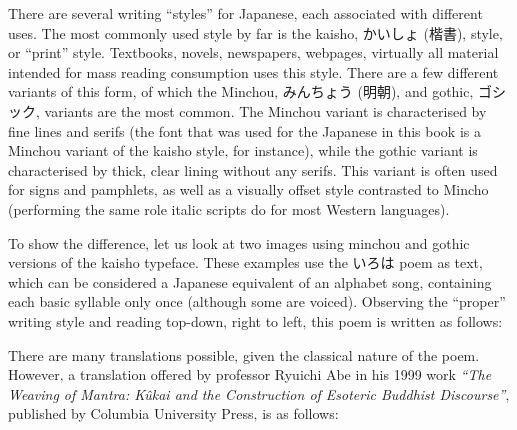 \documentclass[11pt, b5paper, twoside, openright, onecolumn]{book}
\makeatletter
\newcommand*{\rubystack}[2]{{\relscale{0.5}%
  \begin{tabular}[b]{@{}c@{}}%
    {#1}\\%
   {\textscale{2}{#2}}%
  \end{tabular}}%
}
\DeclareRobustCommand*{\ruby}[2]{%
  \mbox{%
    \setlength{\parskip}{0ex}%
    \BeginAccSupp{method=pdfstringdef,ActualText={#1}}%
      \rubystack{\phantom{#2}}{#1}%
      \llap{%
        \rubystack{#2}{\phantom{#1}}%
      }%
    \EndAccSupp{}%
  }%
}
\renewcommand*{\ruby}[2]{#2 (#1)}%
\makeatother
\begin{document}
There are several writing “styles” for Japanese‚ each associated with different uses. The most commonly used style by far is the kaisho‚ \ruby{楷書}{かいしょ}‚ style‚ or “print” style. Textbooks‚ novels‚ newspapers‚ webpages‚ virtually all material intended for mass reading consumption uses this style. There are a few different variants of this form‚ of which the Minchou‚ \ruby{明朝}{みんちょう}‚ and gothic‚ ゴシック‚ variants are the most common. The Minchou variant is characterised by fine lines and serifs (the font that was used for the Japanese in this book is a Minchou variant of the kaisho style‚ for instance)‚ while the gothic variant is characterised by thick‚ clear lining without any serifs. This variant is often used for signs and pamphlets‚ as well as a visually offset style contrasted to Mincho (performing the same role italic scripts do for most Western languages).

To show the difference‚ let us look at two images using minchou and gothic versions of the kaisho typeface. These examples use the いろは poem as text‚ which can be considered a Japanese equivalent of an alphabet song‚ containing each basic syllable only once (although some are voiced). Observing the “proper” writing style and reading top-down‚ right to left‚ this poem is written as follows:


There are many translations possible‚ given the classical nature of the poem. However‚ a translation offered by professor Ryuichi Abe in his 1999 work \textit{“The Weaving of Mantra: Kûkai and the Construction of Esoteric Buddhist Discourse”}‚ published by Columbia University Press‚ is as follows:
\end{document}
